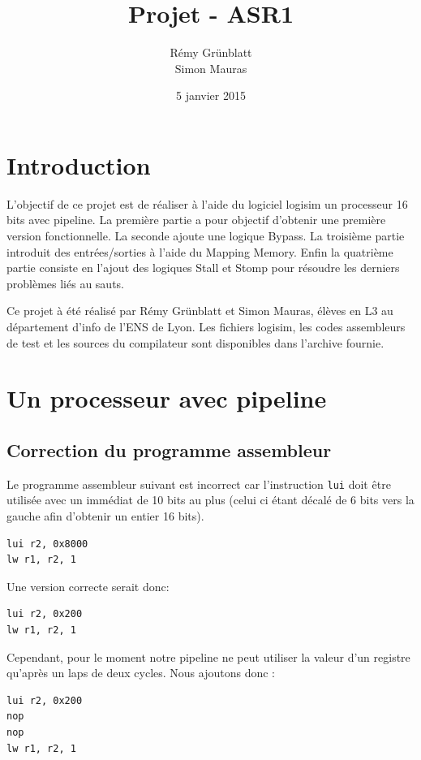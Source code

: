 \documentclass[a4paper]{article}
\title{Projet - ASR1}
\author{Rémy Grünblatt\\Simon Mauras}
\date{5 janvier 2015}
\begin{document}
  
  \maketitle

  \section*{Introduction}

  L'objectif de ce projet est de réaliser à l'aide du logiciel logisim un processeur 16 bits avec pipeline. La première partie a pour objectif d'obtenir une première version fonctionnelle. La seconde ajoute une logique Bypass. La troisième partie introduit des entrées/sorties à l'aide du Mapping Memory. Enfin la quatrième partie consiste en l'ajout des logiques Stall et Stomp pour résoudre les derniers problèmes liés au sauts.

  Ce projet à été réalisé par Rémy Grünblatt et Simon Mauras, élèves en L3 au département d'info de l'ENS de Lyon. Les fichiers logisim, les codes assembleurs de test et les sources du compilateur sont disponibles dans l'archive fournie.

  \tableofcontents
  
  \newpage
  
  \section{Un processeur avec pipeline}
  
  \subsection{Correction du programme assembleur}
  Le programme assembleur suivant est incorrect car l'instruction \verb|lui| doit être utilisée avec un immédiat de 10 bits au plus (celui ci étant décalé de 6 bits vers la gauche afin d'obtenir un entier 16 bits).
\begin{verbatim}
lui r2, 0x8000
lw r1, r2, 1
\end{verbatim}
  Une version correcte serait donc: 
\begin{verbatim}
lui r2, 0x200
lw r1, r2, 1
\end{verbatim}
  Cependant, pour le moment notre pipeline ne peut utiliser la valeur d'un registre qu'après un laps de deux cycles. Nous ajoutons donc :
\begin{verbatim}
lui r2, 0x200
nop
nop
lw r1, r2, 1
\end{verbatim} 
\end{document}
